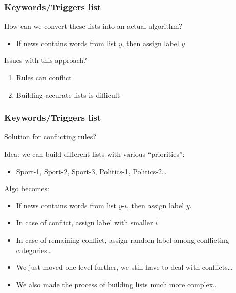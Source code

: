 \documentclass[usenames,dvipsnames]{beamer}
\begin{document}
\begin{frame}\frametitle{Keywords/Triggers list}

How can we convert these lists into an actual algorithm?
\begin{itemize}
  \item If news contains words from list $y$, then assign label $y$
\end{itemize}

\vspace{0.4cm}
Issues with this approach?
\pause
\begin{enumerate}
  \item Rules can conflict
  \item Building accurate lists is difficult
\end{enumerate}
\end{frame}


\begin{frame}\frametitle{Keywords/Triggers list}

Solution for conflicting rules?
\pause

\vspace{0.4cm}
Idea: we can build different lists with various ``priorities'':
\begin{itemize}
\item Sport-1, Sport-2, Sport-3, Politics-1, Politics-2\ldots
\end{itemize}

\vspace{0.4cm}
Algo becomes:
\begin{itemize}
  \item If news contains words from list $y$-$i$, then assign label $y$.
  \item In case of conflict, assign label with smaller $i$
  \item In case of remaining conflict, assign random label among
    conflicting categories\dots
\end{itemize}

\pause
\vspace{0.4cm}
\begin{itemize}
\item We just moved one level further, we still have to deal with conflicts\dots
\item We also made the process of building lists much more complex\dots
\end{itemize}
\end{frame}
\end{document}
